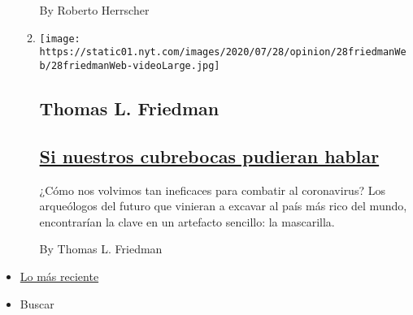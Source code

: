 \begin{enumerate}
\begin{enumerate}
    By Roberto Herrscher
  \item
    \texttt{[image: https://static01.nyt.com/images/2020/07/28/opinion/28friedmanWeb/28friedmanWeb-videoLarge.jpg]}

    \hypertarget{thomas-l-friedman}{%
    \subsection{Thomas L. Friedman}\label{thomas-l-friedman}}

    \hypertarget{si-nuestros-cubrebocas-pudieran-hablar}{%
    \subsection{\texorpdfstring{\href{/es/2020/07/30/espanol/opinion/usar-cubrebocas-politica.html}{Si
    nuestros cubrebocas pudieran
    hablar}}{Si nuestros cubrebocas pudieran hablar}}\label{si-nuestros-cubrebocas-pudieran-hablar}}

    ¿Cómo nos volvimos tan ineficaces para combatir al coronavirus? Los
    arqueólogos del futuro que vinieran a excavar al país más rico del
    mundo, encontrarían la clave en un artefacto sencillo: la
    mascarilla.

    By Thomas L. Friedman
  \end{enumerate}
\end{enumerate}

\begin{itemize}
\tightlist
\item
  \protect\hyperlink{stream-panel}{Lo más reciente}
\item
  Buscar
\end{itemize}

